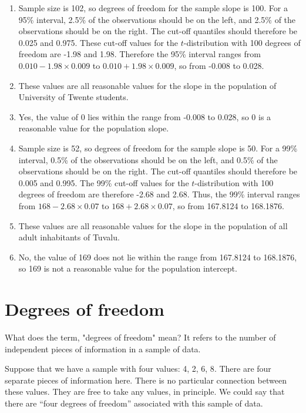 \documentclass[]{report}\usepackage[]{graphicx}\usepackage[]{color}
\begin{document}
\begin{enumerate}

\item Sample size is 102, so degrees of freedom for the sample slope is 100. For a 95\% interval, 2.5\% of the observations should be on the left, and 2.5\% of the observations should be on the right. The cut-off quantiles should therefore be 0.025 and 0.975. These cut-off values for the $t$-distribution with 100 degrees of freedom are -1.98 and 1.98. Therefore the 95\% interval ranges from $0.010 - 1.98 \times 0.009$ to $0.010 + 1.98 \times 0.009$, so from -0.008 to 0.028.

\item These values are all reasonable values for the slope in the population of University of Twente students.

\item Yes, the value of 0 lies within the range from -0.008 to 0.028, so 0 is a reasonable value for the population slope.

\item Sample size is 52, so degrees of freedom for the sample slope is 50. For a 99\% interval, 0.5\% of the observations should be on the left, and 0.5\% of the observations should be on the right. The cut-off quantiles should therefore be 0.005 and 0.995. The 99\% cut-off values for the $t$-distribution with 100 degrees of freedom are therefore -2.68 and 2.68. Thus, the 99\% interval ranges from $168 - 2.68 \times 0.07$ to $168 + 2.68 \times 0.07$, so from 167.8124 to 168.1876.

\item These values are all reasonable values for the slope in the population of all adult inhabitants of Tuvalu.

\item No, the value of 169 does not lie within the range from 167.8124 to 168.1876, so 169 is not a reasonable value for the population intercept.


\end{enumerate}
%

\section{Degrees of freedom}


What does the term, "degrees of freedom" mean? It refers to the number of independent pieces of information in a sample of data.

Suppose that we have a sample with four values: {4, 2, 6, 8}. There are four separate pieces of information here. There is no particular connection between these values. They are free to take any values, in principle. We could say that there are “four degrees of freedom” associated with this sample of data.
\end{document}
